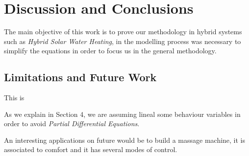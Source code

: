 \chapter{Discussion and Conclusions}
\label{ch:conclusions}
The main objective of this work is to prove our methodology in hybrid 
systems such as \emph{Hybrid Solar Water Heating}, in the modelling 
process was necessary to simplify the equations in order to focus us 
in the general methodology. 

\section{Limitations and Future Work}
This is 
\label{sec:limitations}

As we explain in Section 4, we are assuming lineal some behaviour
variables in order to avoid \emph{Partial Differential Equations}.

An interesting applications on future would be  to build a massage 
machine, it is associated to comfort and it has several modes of 
control.

